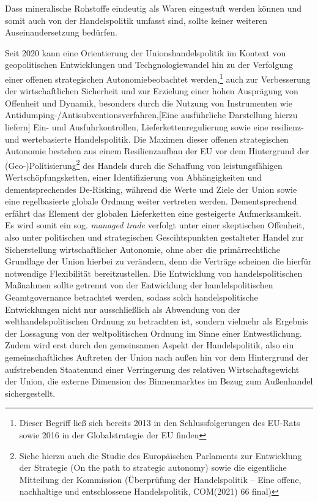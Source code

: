 \documentclass[12pt,a4paper,oneside]{book} %
\begin{document}
Dass mineralische Rohstoffe eindeutig als Waren eingestuft werden können und somit auch von der Handelspolitik umfasst sind, sollte keiner weiteren Auseinandersetzung bedürfen.
	
Seit 2020 kann eine Orientierung der Unionshandelspolitik im Kontext von geopolitischen Entwicklungen und Techgnologiewandel hin zu der Verfolgung einer \glqq offenen strategischen Autonomie\grqq beobachtet werden,\footnote{Dieser Begriff ließ sich bereits 2013 in den Schlussfolgerungen des EU-Rats sowie 2016 in der Globalstrategie der EU finden} auch zur Verbesserung der wirtschaftlichen Sicherheit und zur Erzielung einer hohen Ausprägung von Offenheit und Dynamik, besonders durch die Nutzung von Instrumenten wie Antidumping-/Antisubventionsverfahren,[Eine ausführliche Darstellung hierzu liefern]\autocite{Müller-Ibold/Herrmann, EuZW 2022, 1085} Ein- und Ausfuhrkontrollen, Lieferkettenregulierung sowie eine resilienz- und wertebasierte Handelspolitik.\autocite{Paschke, RdTW 2024, 206; Schäffer/Hach, ZRP 2023, 207f; Müller-Ibold, EuZW 2022, 1029, 1034} Die Maximen dieser offenen strategischen Autonomie bestehen aus einem Resilienzaufbau der EU vor dem Hintergrund der (Geo-)Politisierung\footnote{Siehe hierzu auch die Studie des Europäischen Parlaments zur Entwicklung der Strategie (On the path to \glq strategic autonomy\grq) sowie die eigentliche Mitteilung der Kommission (\glqq Überprüfung der Handelspolitik -- Eine offene, nachhaltige und entschlossene Handelspolitik\grqq, COM(2021) 66 final)} des Handels durch die Schaffung von leistungsfähigen Wertschöpfungsketten, einer Identifizierung von Abhängigkeiten und dementsprechendes De-Risking, während die Werte und Ziele der Union sowie eine regelbasierte globale Ordnung weiter vertreten werden.\autocite{Schäffer/hach, ZRP 2023, 207} Dementsprechend erfährt das Element der globalen Lieferketten eine gesteigerte Aufmerksamkeit.\autocite{bibid} Es wird somit ein sog. \textit{managed trade} verfolgt unter einer \glqq skeptischen Offenheit\grqq, also unter politischen und strategischen Gescihtspunkten gestalteter Handel zur Sicherstellung wirtschaftlicher Autonomie, ohne aber die primärrechtliche Grundlage der Union hierbei zu verändern, denn die Verträge scheinen die hierfür notwendige Flexibilität bereitzustellen.\autocite[so zumindest]{Paschke, RdTW 2024, 206, 216; Schäffer, EuZW 2023, 695, 700} Die Entwicklung von handelspolitischen Maßnahmen sollte getrennt von der Entwicklung der handelspolitischen Geamtgovernance betrachtet werden, sodass solch handelspolitische Entwicklungen nicht nur ausschließlich als Abwendung von der welthandelspolitischen Ordnung zu betrachten ist, sondern vielmehr als Ergebnis der Lossagung von der weltpolitischen Ordnung im Sinne einer \glqq Entwestlichung\grqq.\autocite{Altemöller, EuZW 2019, 321ff} Zudem wird erst durch den gemeinsamen Aspekt der Handelspolitik, also ein gemeinschaftliches Auftreten der Union nach außen hin vor dem Hintergrund der \glqq aufstrebenden Staaten\grqq und einer Verringerung des relativen Wirtschaftsgewicht der Union, die externe Dimension des Binnenmarktes im Bezug zum Außenhandel sichergestellt.\autocite{Callies/Ruffert, Art. 206 AEUV, Rn. 3; Art. 207 Rn. 3; EuGH, Gutachten 1/75, Slg. 1975, 1355, S. 1363 f.}
\end{document}
